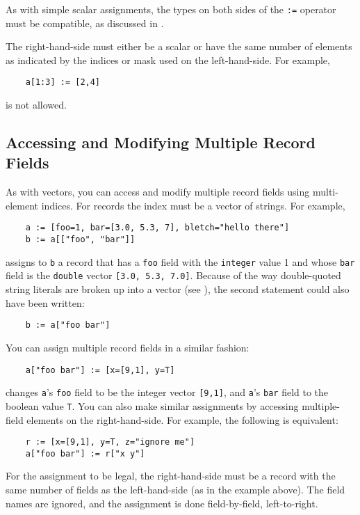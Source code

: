 As with simple scalar assignments, the types on both sides
of the {\tt :=} operator must be compatible, as discussed in
.

The right-hand-side must either be a scalar or have the same number of
elements as indicated by the indices or mask used on the left-hand-side.
For example,
\begin{verbatim}
    a[1:3] := [2,4]
\end{verbatim}
is not allowed.

\subsection{Accessing and Modifying Multiple Record Fields}
\label{multiple-record-fields}

As with vectors, you can access and modify multiple record fields
using multi-element indices.  For records the index must be a vector
of strings.  For example,
\begin{verbatim}
    a := [foo=1, bar=[3.0, 5.3, 7], bletch="hello there"]
    b := a[["foo", "bar"]]
\end{verbatim}
assigns to {\tt b} a record that has a  {\tt foo} field with the
{\tt integer} value
1 and whose {\tt bar} field is the {\tt double} vector {\tt [3.0, 5.3, 7.0]}.
Because of the way double-quoted string literals are broken up into a vector
(see ), the second statement could
also have been written:
\begin{verbatim}
    b := a["foo bar"]
\end{verbatim}

You can assign multiple record fields in a similar fashion:
\begin{verbatim}
    a["foo bar"] := [x=[9,1], y=T]
\end{verbatim}
changes {\tt a}'s {\tt foo} field to be the integer vector {\tt [9,1]},
and {\tt a}'s {\tt bar} field to the boolean value {\tt T}.  You can
also make similar assignments by accessing multiple-field elements
on the right-hand-side.  For example, the following is equivalent:
\begin{verbatim}
    r := [x=[9,1], y=T, z="ignore me"]
    a["foo bar"] := r["x y"]
\end{verbatim}
For the assignment to be legal, the right-hand-side must be a record with
the same number of fields as the left-hand-side (as in the example above).
The field names are ignored, and the assignment is done field-by-field,
left-to-right.

